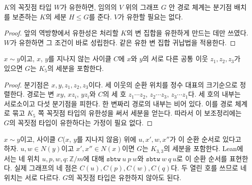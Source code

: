 \begin{lemma}
\label{lem:paths_finite_source}
\leanok
\(K\)의 꼭짓점 타입 \(W\)가 유한하면, 임의의 \(V\) 위의 그래프 \(G\) 안 경로 체계는 분기점 배치를
보존하는 \(K\)의 세분 \(H \le G\)를 준다. \(V\)가 유한할 필요는 없다.
\end{lemma}

\begin{proof}
\leanok
앞의 역방향에서 유한성은 처리할 \(K\)의 변 집합을 유한하게 만드는 데만 쓰였다. \(W\)가 유한하면 그
조건이 바로 성립한다. 같은 유한 변 집합 귀납법을 적용한다.
\end{proof}

\begin{lemma}[공통 이웃 셋이면 \(TK_5\)]
\label{lem:TK5_of_common}
\leanok
\(x \sim y\)이고, \(x\), \(y\)를 지나지 않는 사이클 \(C\)에 \(x\)와 \(y\)의 서로 다른 공통 이웃 \(z_1, z_2, z_3\)가
있으면 \(G\)는 \(K_5\)의 세분을 포함한다.
\end{lemma}

\begin{proof}
\leanok
분기점은 \(x, y, z_1, z_2, z_3\)이다. 세 이웃의 순환 위치를 정수 대표의 크기순으로 정렬한다.
경로는 변 \(xy\), \(xz_i\), \(yz_i\)와 \(C\)의 세 호 \(z_1 \cdots z_2\), \(z_2 \cdots z_3\),
\(z_3 \cdots z_1\)다. 세 호의 내부는 서로소이고 다섯 분기점을 피한다. 한 변짜리 경로의 내부는 비어
있다. 이를 경로 체계로 묶고 \(K_5\) 쪽 꼭짓점 타입의 유한성을 써서 세분을 얻는다.
따라서 이 보조정리에는 \(G\)의 꼭짓점 타입이 유한하다는 가정이 필요 없다.
\end{proof}

\begin{lemma}
\label{lem:TK33_of_alt}
\leanok
\(x \sim y\)이고, 사이클 \(C\)(\(x\), \(y\)를 지나지 않음) 위에 \(u, x', w, x''\)가 이 순환 순서로 있다고
하자. \(u, w \in N(y)\)이고 \(x', x'' \in N(x)\)이면 \(G\)는 \(K_{3,3}\)의 세분을 포함한다.
Lean에서는 네 위치 \(u,p,w,q : \mathbb{Z}/m\)에 대해 \(\texttt{sbtw}\ u\ p\ w\)와
\(\texttt{sbtw}\ w\ q\ u\)로 이 순환 순서를 표현한다. 실제 그래프의 네 점은 \(C(u),C(p),C(w),C(q)\)다.
두 열린 호를 쓰므로 네 위치는 서로 다르다. \(G\)의 꼭짓점 타입은 유한하지 않아도 된다.
\end{lemma}

